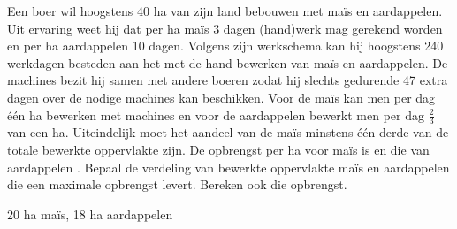 \begin{oef}
Een boer wil hoogstens 40 ha van zijn land bebouwen met
     ma\"{i}s en aardappelen. Uit ervaring weet hij dat per ha ma\"{i}s
     $3$ dagen
     (hand)werk mag gerekend worden en per ha aardappelen 10 dagen.
     Volgens zijn werkschema kan hij hoogstens 240 werkdagen besteden
     aan het met de hand bewerken van ma\"{i}s en aardappelen. De machines
     bezit hij samen met andere boeren zodat hij slechts gedurende 47
     extra dagen over de nodige machines kan beschikken. Voor de 
     ma\"{i}s kan men per dag  \'{e}\'{e}n ha bewerken met 
     machines en voor 
     de aardappelen bewerkt men per dag $\frac{2}{3}$ van een ha. 
     Uiteindelijk  moet het aandeel van de ma\"{i}s minstens  \'{e}\'{e}n
     derde van de totale bewerkte oppervlakte zijn. De opbrengst
     per ha
     voor ma\"{i}s  is en die van aardappelen .
Bepaal de verdeling van bewerkte oppervlakte ma\"{i}s en
     aardappelen die een maximale opbrengst levert. Bereken ook die
     opbrengst. 
     \begin{opl}
     20 ha ma\"is, 18 ha aardappelen
     \end{opl}
\end{oef}
     
     
     

